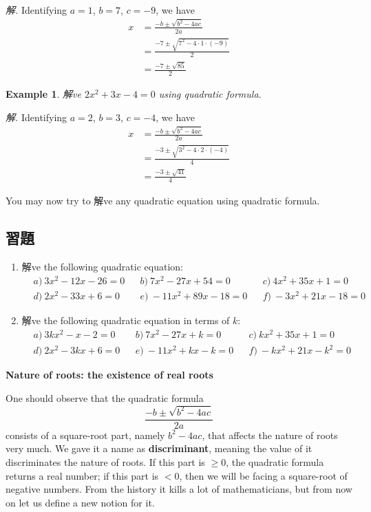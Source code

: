 \documentclass[12pt]{article}
\newtheorem{example}{Example}
\begin{document}
    \textit{ 解.} Identifying $a=1$, $b=7$, $c=-9$, we have \begin{align*}
        x&=\frac{-b\pm\sqrt{b^2-4ac}}{2a}\\
        &=\frac{-7\pm\sqrt{7^2-4\cdot 1\cdot (-9)}}{2}\\
        &=\frac{-7\pm\sqrt{85}}{2}
    \end{align*}

    \begin{example}
        解ve $2x^2+3x-4=0$ using quadratic formula.
    \end{example}

    \textit{ 解.} Identifying $a=2$, $b=3$, $c=-4$, we have \begin{align*}
        x&=\frac{-b\pm\sqrt{b^2-4ac}}{2a}\\
        &=\frac{-3\pm\sqrt{3^2-4\cdot 2\cdot (-4)}}{4}\\
        &=\frac{-3\pm\sqrt{41}}{4}
    \end{align*}

    You may now try to 解ve any quadratic equation using quadratic formula.

    \subsection*{習題}

    \begin{enumerate}
        \item 解ve the following quadratic equation:\begin{align*}
            &a)\ 3x^2-12x-26=0&&b)\ 7x^2-27x+54=0&&c)\ 4x^2+35x+1=0\\
            &d)\ 2x^2-33x+6=0&&e)\ -11x^2+89x-18=0&&f)\ -3x^2+21x-18=0
        \end{align*}
        \item 解ve the following quadratic equation in terms of $k$:\begin{align*}
            &a)\ 3kx^2-x-2=0&&b)\ 7x^2-27x+k=0&&c)\ kx^2+35x+1=0\\
            &d)\ 2x^2-3kx+6=0&&e)\ -11x^2+kx-k=0&&f)\ -kx^2+21x-k^2=0
        \end{align*}
    \end{enumerate}

    \begin{center}
        \textbf{Nature of roots: the existence of real roots}
    \end{center}

    One should observe that the quadratic formula $$\frac{-b\pm \sqrt{b^2-4ac}}{2a}$$ consists of a square-root part, namely $b^2-4ac$, that affects the nature of roots very much. We gave it a name as \textbf{discriminant}, meaning the value of it discriminates the nature of roots. If this part is $\geq 0$, the quadratic formula returns a real number; if this part is $< 0$, then we will be facing a square-root of negative numbers. From the history it kills a lot of mathematicians, but from now on let us define a new notion for it.
\end{document}
